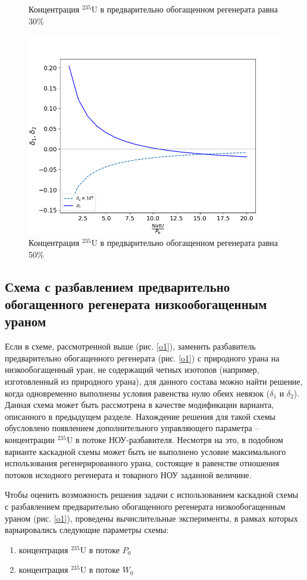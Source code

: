 \begin{figure}[ht]
\begin{minipage}{.5\textwidth}
    \caption{Концентрация $^{235}$U в предварительно обогащенном регенерата равна 30\%}
    \label{delta3}
  \end{minipage}
  \begin{minipage}{.5\textwidth}
    \centering
    \includegraphics[width=.8\linewidth]{images/plots/50}  
    \caption{Концентрация $^{235}$U в предварительно обогащенном регенерата равна 50\%}
    \label{delta4}
  \end{minipage}
 \end{figure}


\subsection{Схема с разбавлением предварительно обогащенного регенерата низкообогащенным ураном}

Если в схеме, рассмотренной выше (рис. \ref{o1}), заменить разбавитель предварительно обогащенного регенерата (рис. \ref{o1}) с природного урана на низкообогащенный уран, не содержащий четных изотопов (например, изготовленный из природного урана), для данного состава можно найти решение, когда одновременно выполнены условия равенства нулю обеих невязок ($\delta_1$ и $\delta_2$). Данная схема может быть рассмотрена в качестве модификации варианта, описанного в предыдущем разделе. Нахождение решения для такой схемы обусловлено появлением дополнительного управляющего параметра -- концентрации $^{235}$U в потоке НОУ-разбавителя.  Несмотря на это, в подобном варианте каскадной схемы может быть не выполнено условие максимального использования регенерированного урана, состоящее в равенстве отношения потоков исходного регенерата и товарного НОУ заданной величине.

Чтобы оценить возможность решения задачи с использованием каскадной схемы с разбавлением предварительно обогащенного регенерата низкообогащенным ураном (рис. \ref{o1}), проведены вычислительные эксперименты, в рамках которых варьировались следующие параметры схемы:
\begin{enumerate}
  \item концентрация $^{235}$U в потоке $P_0$
  \item концентрация $^{235}$U в потоке $W_0$
\end{enumerate}

